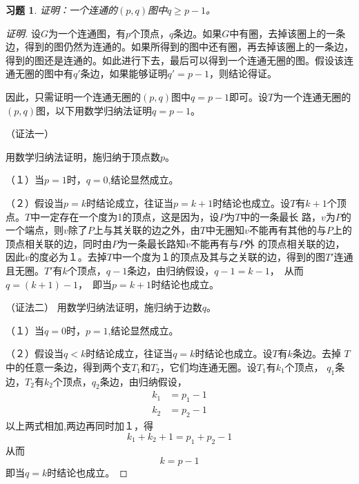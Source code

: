 \documentclass{article}
\begin{document}
\begin{CJK}{UTF8}{gbsn}
\newtheorem*{Exercise}{习题}
  \begin{Exercise}
  证明：一个连通的$(p,q)$图中$q\geq p - 1$。  
  \end{Exercise}
  \begin{proof}[证明]
    设$G$为一个连通图，有$p$个顶点，$q$条边。如果$G$中有圈，去掉该圈上的一条边，得到的图仍然为连通的。如果所得到的图中还有圈，再去掉该圈上的一条边，得到的图还是连通的。如此进行下去，最后可以得到一个连通无圈的图。假设该连通无圈的图中有$q'$条边，如果能够证明$q'=p-1$，则结论得证。

    因此，只需证明一个连通无圈的$(p,q)$图中$q=p-1$即可。设$T$为一个连通无圈的$(p,q)$图，以下用数学归纳法证明$q=p-1$。

    
  （证法一）
  
    用数学归纳法证明，施归纳于顶点数$p$。
    
    （１）当$p=1$时，$q=0$,结论显然成立。

    （２）假设当$p=k$时结论成立，往证当$p=k+1$时结论也成立。设$T$有$k+1$个顶点。$T$中一定存在一个度为1的顶点，这是因为，设$P$为$T$中的一条最长
    路，$v$为$P$的一个端点，则$v$除了$P$上与其关联的边之外，由$T$中无圈知$v$不能再有其他的与$P$上的顶点相关联的边，同时由$P$为一条最长路知$v$不能再有与$P$外
    的顶点相关联的边，因此$v$的度必为１。去掉$T$中一个度为１的顶点及其与之关联的边，得到的图$T'$连通且无圈。$T'$有$k$个顶点，$q-1$条边，由归纳假设，$q-1 = k - 1$，　从而$q = (k +1) - 1$，　即当$p=k+1$时结论也成立。

（证法二）
      用数学归纳法证明，施归纳于边数$q$。
    
    （１）当$q=0$时，$p=1$,结论显然成立。

    （２）假设当$q<k$时结论成立，往证当$q=k$时结论也成立。设$T$有$k$条边。去掉
    $T$中的任意一条边，得到两个支$T_1$和$T_2$，它们均连通无圈。设$T_1$有$k_1$个顶点，
    $q_1$条边，$T_2$有$k_2$个顶点，$q_2$条边，由归纳假设，
    \begin{equation*}
      \begin{split}
        k_1 &= p_1 - 1\\
        k_2 &= p_2 - 1
      \end{split}
    \end{equation*}
    以上两式相加,两边再同时加１，得
    \[k_1 + k_2  + 1 = p_1 + p_2 - 1\]
    从而
    \[k = p - 1 \]
    即当$q=k$时结论也成立。
\end{proof}

\end{CJK}
\end{document}
